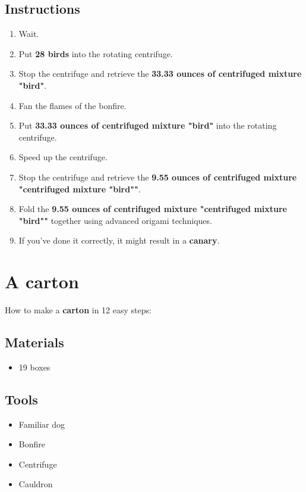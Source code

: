 \documentclass{article}
\begin{document}
\subsection{Instructions}\begin{enumerate}
\item 
Wait.
\item 
Put \textbf{28 birds} into the rotating centrifuge.
\item 
Stop the centrifuge and retrieve the \textbf{33.33 ounces of centrifuged mixture "bird"}.
\item 
Fan the flames of the bonfire.
\item 
Put \textbf{33.33 ounces of centrifuged mixture "bird"} into the rotating centrifuge.
\item 
Speed up the centrifuge.
\item 
Stop the centrifuge and retrieve the \textbf{9.55 ounces of centrifuged mixture "centrifuged mixture "bird""}.
\item 
Fold the \textbf{9.55 ounces of centrifuged mixture "centrifuged mixture "bird""} together using advanced origami techniques.
\item 
If you've done it correctly, it might result in a \textbf{canary}.
\end{enumerate}
\newpage
\section{A carton}How to make a \textbf{carton} in 12 easy steps:

\subsection{Materials}\begin{itemize}
\item 
19 boxes
\end{itemize}
\subsection{Tools}\begin{itemize}
\item 
Familiar dog
\item 
Bonfire
\item 
Centrifuge
\item 
Cauldron
\end{itemize}
\end{document}
